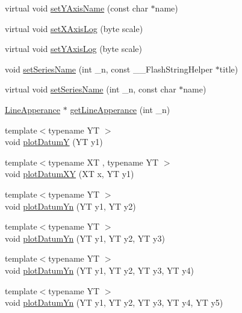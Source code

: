 \begin{DoxyCompactItemize}
\item 
virtual void \hyperlink{class_serial_graph_ab0c675c8682959261f79dcf37b04148c}{set\+Y\+Axis\+Name} (const char $\ast$name)
\item 
virtual void \hyperlink{class_serial_graph_ae58de4fa4d391f1a2f411ce00dd74d93}{set\+X\+Axis\+Log} (byte scale)
\item 
virtual void \hyperlink{class_serial_graph_a444e38e8ef3784942ca6ee58940f7023}{set\+Y\+Axis\+Log} (byte scale)
\item 
void \hyperlink{class_serial_graph_a84d8e8ce9bff20e53ba738d1d34d3577}{set\+Series\+Name} (int \+\_\+n, const \+\_\+\+\_\+\+Flash\+String\+Helper $\ast$title)
\item 
virtual void \hyperlink{class_serial_graph_a9d67fbecbee6edb82646aa7ba5103046}{set\+Series\+Name} (int \+\_\+n, const char $\ast$name)
\item 
\hyperlink{struct_line_apperance}{Line\+Apperance} $\ast$ \hyperlink{class_serial_graph_a5a6008dc86a2101a58782929721a5b77}{get\+Line\+Apperance} (int \+\_\+n)
\item 
{\footnotesize template$<$typename Y\+T $>$ }\\void \hyperlink{class_serial_graph_afbcc26bd6bad7179d75379ac0f0d25f1}{plot\+Datum\+Y} (Y\+T y1)
\item 
{\footnotesize template$<$typename X\+T , typename Y\+T $>$ }\\void \hyperlink{class_serial_graph_a265b48fb0afe543e14cedb6619e3931e}{plot\+Datum\+X\+Y} (X\+T x, Y\+T y1)
\item 
{\footnotesize template$<$typename Y\+T $>$ }\\void \hyperlink{class_serial_graph_a56f584fa6316175bc9fbcb4f671f1c93}{plot\+Datum\+Yn} (Y\+T y1, Y\+T y2)
\item 
{\footnotesize template$<$typename Y\+T $>$ }\\void \hyperlink{class_serial_graph_ae755b026606e34c33c4aa8f10d8b5d9c}{plot\+Datum\+Yn} (Y\+T y1, Y\+T y2, Y\+T y3)
\item 
{\footnotesize template$<$typename Y\+T $>$ }\\void \hyperlink{class_serial_graph_a354feb95f91239699d3510c2ce5659b0}{plot\+Datum\+Yn} (Y\+T y1, Y\+T y2, Y\+T y3, Y\+T y4)
\item 
{\footnotesize template$<$typename Y\+T $>$ }\\void \hyperlink{class_serial_graph_ab0fff3fc1879e1cd6aadf24c913ff617}{plot\+Datum\+Yn} (Y\+T y1, Y\+T y2, Y\+T y3, Y\+T y4, Y\+T y5)
\item 

\end{DoxyCompactItemize}
